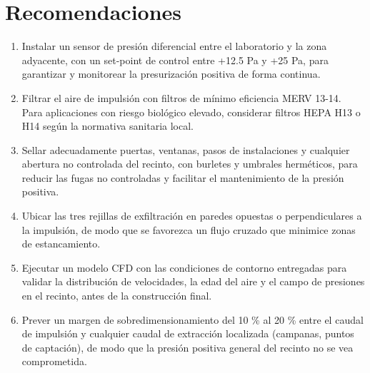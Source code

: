 \section{Recomendaciones}

\begin{enumerate}
	\item Instalar un sensor de presión diferencial entre el laboratorio y la zona adyacente, con un set-point de control entre +12.5 Pa y +25 Pa, para garantizar y monitorear la presurización positiva de forma continua.
	\item Filtrar el aire de impulsión con filtros de mínimo eficiencia MERV 13-14. Para aplicaciones con riesgo biológico elevado, considerar filtros HEPA H13 o H14 según la normativa sanitaria local.
	\item Sellar adecuadamente puertas, ventanas, pasos de instalaciones y cualquier abertura no controlada del recinto, con burletes y umbrales herméticos, para reducir las fugas no controladas y facilitar el mantenimiento de la presión positiva.
	\item Ubicar las tres rejillas de exfiltración en paredes opuestas o perpendiculares a la impulsión, de modo que se favorezca un flujo cruzado que minimice zonas de estancamiento.
	\item Ejecutar un modelo CFD con las condiciones de contorno entregadas para validar la distribución de velocidades, la edad del aire y el campo de presiones en el recinto, antes de la construcción final.
	\item Prever un margen de sobredimensionamiento del 10 \% al 20 \% entre el caudal de impulsión y cualquier caudal de extracción localizada (campanas, puntos de captación), de modo que la presión positiva general del recinto no se vea comprometida.
\end{enumerate}

